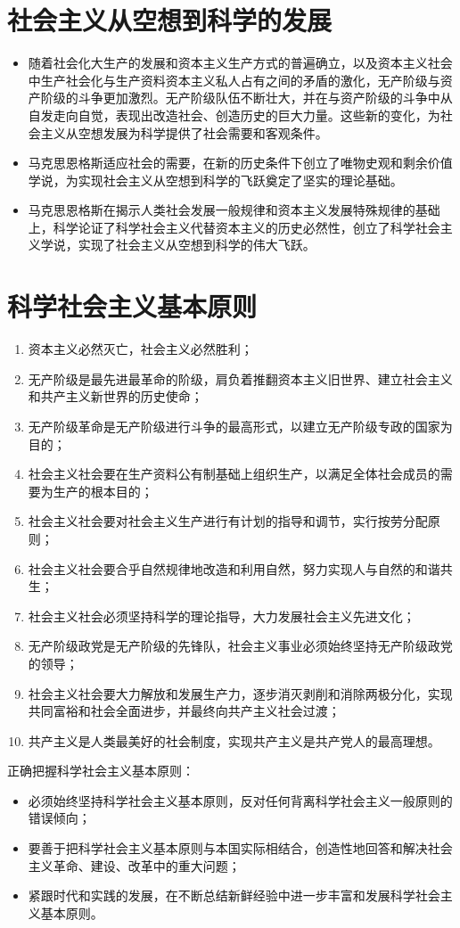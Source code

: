 \documentclass[12pt,openany]{ctexbook}
\newcommand{\zhemph}[1]{{\kaishu #1}}
\begin{document}
\section{社会主义从空想到科学的发展}
\begin{itemize}
  \item 随着社会化大生产的发展和资本主义生产方式的普遍确立，以及资本主义社会中生产社会化与生产资料资本主义私人占有之间的矛盾的激化，无产阶级与资产阶级的斗争更加激烈。无产阶级队伍不断壮大，并在与资产阶级的斗争中从自发走向自觉，表现出改造社会、创造历史的巨大力量。这些新的变化，为社会主义从空想发展为科学提供了社会需要和客观条件。
  \item 马克思恩格斯适应社会的需要，在新的历史条件下创立了\zhemph{唯物史观}和\zhemph{剩余价值学说}，为实现社会主义从空想到科学的飞跃奠定了坚实的理论基础。
  \item 马克思恩格斯在揭示人类社会发展一般规律和资本主义发展特殊规律的基础上，科学论证了科学社会主义代替资本主义的历史必然性，创立了科学社会主义学说，实现了社会主义从空想到科学的伟大飞跃。
\end{itemize}
\section{科学社会主义基本原则}
\begin{enumerate}
  \item 资本主义必然灭亡，社会主义必然胜利；
  \item 无产阶级是最先进最革命的阶级，肩负着推翻资本主义旧世界、建立社会主义和共产主义新世界的历史使命；
  \item 无产阶级革命是无产阶级进行斗争的最高形式，以建立无产阶级专政的国家为目的；
  \item 社会主义社会要在生产资料公有制基础上组织生产，以满足全体社会成员的需要为生产的根本目的；
  \item 社会主义社会要对社会主义生产进行有计划的指导和调节，实行按劳分配原则；
  \item 社会主义社会要合乎自然规律地改造和利用自然，努力实现人与自然的和谐共生；
  \item 社会主义社会必须坚持科学的理论指导，大力发展社会主义先进文化；
  \item 无产阶级政党是无产阶级的先锋队，社会主义事业必须始终坚持无产阶级政党的领导；
  \item 社会主义社会要大力解放和发展生产力，逐步消灭剥削和消除两极分化，实现共同富裕和社会全面进步，并最终向共产主义社会过渡；
  \item 共产主义是人类最美好的社会制度，实现共产主义是共产党人的最高理想。
\end{enumerate}
正确把握科学社会主义基本原则：
\begin{itemize}
  \item 必须始终坚持科学社会主义基本原则，反对任何背离科学社会主义一般原则的错误倾向；
  \item 要善于把科学社会主义基本原则与本国实际相结合，创造性地回答和解决社会主义革命、建设、改革中的重大问题；
  \item 紧跟时代和实践的发展，在不断总结新鲜经验中进一步丰富和发展科学社会主义基本原则。
\end{itemize}
\end{document}
